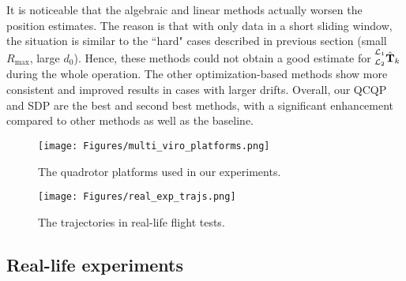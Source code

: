 \documentclass[journal]{IEEEtran}
\begin{document}
It is noticeable that the algebraic and linear methods actually worsen the position estimates. The reason is that with only data in a short sliding window, the situation is similar to the “hard" cases described in previous section (small $R_{\max}$, large $d_0$). Hence, these methods could not obtain a good estimate for $\prescript{\mathcal{L}_1}{\mathcal{L}_2}{\hat{\mathbf{T}}}_k$ during the whole operation. The other optimization-based methods show more consistent and improved results in cases with larger drifts. Overall, our QCQP and SDP are the best and second best methods, with a significant enhancement compared to other methods as well as the baseline.



\begin{figure}[t]
\centering
	\texttt{[image: Figures/multi\_viro\_platforms.png]}
    \caption{The quadrotor platforms used in our experiments.}
    \label{fig:exp_real_platforms}
\end{figure}

\begin{figure}[t]
\centering
	\texttt{[image: Figures/real\_exp\_trajs.png]}
    \caption{The trajectories in real-life flight tests.}
    \label{fig:exp_real_traj}
\end{figure}


\subsection{Real-life experiments}
\end{document}
